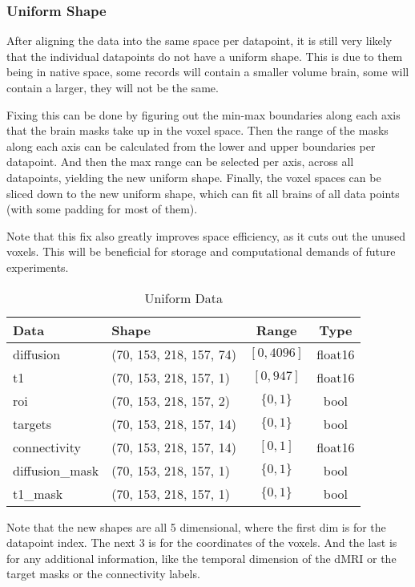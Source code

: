 \subsubsection{Uniform Shape}
After aligning the data into the same space per datapoint, it is still very likely that the individual datapoints do not have a uniform shape. This is due to them being in native space, some records will contain a smaller volume brain, some will contain a larger, they will not be the same.\par
Fixing this can be done by figuring out the min-max boundaries along each axis that the brain masks take up in the voxel space. Then the range of the masks along each axis can be calculated from the lower and upper boundaries per datapoint. And then the max range can be selected per axis, across all datapoints, yielding the new uniform shape. Finally, the voxel spaces can be sliced down to the new uniform shape, which can fit all brains of all data points (with some padding for most of them).\par
Note that this fix also greatly improves space efficiency, as it cuts out the unused voxels. This will be beneficial for storage and computational demands of future experiments.
\begin{table}[H]
\centering
\begin{tabular}{|l|l|c|c|}
\hline
\textbf{Data} & \textbf{Shape} & \textbf{Range} & \textbf{Type} \\ \hline
diffusion & (70, 153, 218, 157, 74) & $[0,4096]$ & float16 \\ \hline
t1 & (70, 153, 218, 157, 1) & $[0,947]$ & float16 \\ \hline
roi & (70, 153, 218, 157, 2) & $\{0,1\}$ & bool \\ \hline
targets & (70, 153, 218, 157, 14) & $\{0,1\}$ & bool \\ \hline
connectivity & (70, 153, 218, 157, 14) & $[0,1]$ & float16 \\ \hline
diffusion\_mask & (70, 153, 218, 157, 1) & $\{0,1\}$ & bool \\ \hline
t1\_mask & (70, 153, 218, 157, 1) & $\{0,1\}$ & bool \\ \hline
\end{tabular}
\caption{Uniform Data}
\label{tab:datas2}
\end{table}
Note that the new shapes are all 5 dimensional, where the first dim is for the datapoint index. The next 3 is for the coordinates of the voxels. And the last is for any additional information, like the temporal dimension of the \ac{dMRI} or the target masks or the connectivity labels.

